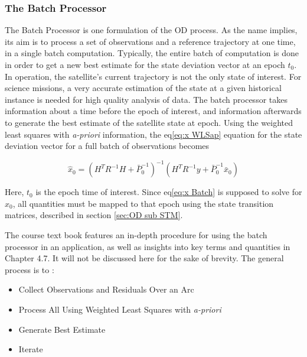 \documentclass[12pt,a4paper,oneside]{article}
\numberwithin{equation}{section}   		%
\begin{document}

\subsubsection{The Batch Processor}
\label{sec:Batch Processor}
The Batch Processor is one formulation of the OD process. As the name implies, its aim is to process a set of observations and a reference trajectory at one time, in a single batch computation. Typically, the entire batch of computation is done in order to get a new best estimate for the state deviation vector at an epoch $t_0$. In operation, the satellite's current trajectory is not the only state of interest. For science missions, a very accurate estimation of the state at a given historical instance is needed for high quality analysis of data. The batch processor takes information about a time before the epoch of interest, and information afterwards to generate the best estimate of the satellite state at epoch. 
Using the weighted least squares with \emph{a-priori} information, the eq\eqref{eq:x WLSap} equation for the state deviation vector for a full batch of observations becomes

\begin{equation}
	\hat{x}_0 = (H^T R^{-1} H + \bar{P}_0^{-1})^{-1}   (H^T R^{-1} y + \bar{P}_0^{-1} \bar{x}_0)
	\label{eq:x Batch}
\end{equation}

Here, $t_0$ is the epoch time of interest. Since eq\eqref{eq:x Batch} is supposed to solve for $\hat{x}_0$, all quantities must be mapped to that epoch using the state transition matrices, described in section \ref{sec:OD sub STM}.

The course text book features an in-depth procedure for using the batch processor in an application, as well as insights into key terms and quantities in Chapter 4.7. It will not be discussed here for the sake of brevity. The general process is to \cite{5070LEC11}:

\begin{itemize}
	\renewcommand{\labelitemi}{$\bullet$}
	\item Collect Observations and Residuals Over an  Arc
	\item Process All Using Weighted Least Squares with \emph{a-priori}
	\item Generate Best Estimate
	\item Iterate
\end{itemize}
\end{document}
